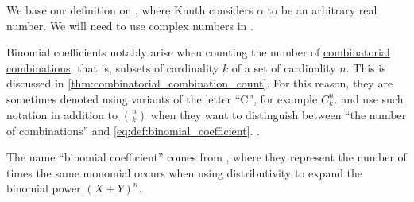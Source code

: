 \begin{comments}
  \item We base our definition on \cite[53]{Knuth1997ArtVol1}, where Knuth considers \( \alpha \) to be an arbitrary real number. We will need to use complex numbers in .

  \item Binomial coefficients notably arise when counting the number of \hyperref[def:combinatorial_combination]{combinatorial combinations}, that is, subsets of cardinality \( k \) of a set of cardinality \( n \). This is discussed in \cref{thm:combinatorial_combination_count}. For this reason, they are sometimes denoted using variants of the letter \enquote{C}, for example \( C_k^n \).  and  use such notation in addition to \( \binom n k \) when they want to distinguish between \enquote{the number of combinations} and \eqref{eq:def:binomial_coefficient}.
  .

  \item The name \enquote{binomial coefficient} comes from , where they represent the number of times the same monomial occurs when using distributivity to expand the binomial power \( (X + Y)^n \).
\end{comments}

